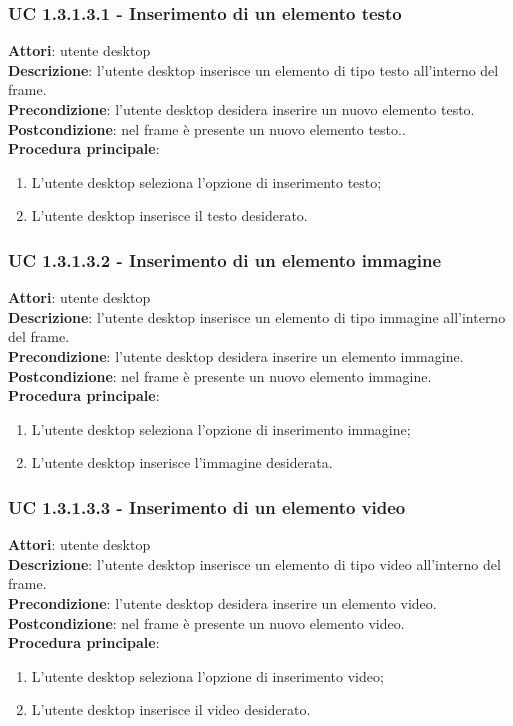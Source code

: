 \subsubsection{UC 1.3.1.3.1 - Inserimento di un elemento testo}{
	\label{uc1.3.1.3.1}
	\textbf{Attori}: utente desktop \\
	\textbf{Descrizione}: l'utente desktop inserisce un elemento di tipo testo all'interno del frame. \\
	\textbf{Precondizione}: l'utente desktop desidera inserire un nuovo elemento testo.	\\
	\textbf{Postcondizione}: nel frame è presente un nuovo elemento testo..	\\
	\textbf{Procedura principale}:
	\begin{enumerate}
		\item L'utente desktop seleziona l'opzione di inserimento testo;
		\item L'utente desktop inserisce il testo desiderato.
	\end{enumerate}
	}
\subsubsection{UC 1.3.1.3.2 - Inserimento di un elemento immagine}{
	\label{uc1.3.1.3.2}
	\textbf{Attori}: utente desktop \\
	\textbf{Descrizione}: l'utente desktop inserisce un elemento di tipo immagine all'interno del frame. \\
	\textbf{Precondizione}: l'utente desktop desidera inserire un elemento immagine.	\\
	\textbf{Postcondizione}: nel frame è presente un nuovo elemento immagine.	\\
	\textbf{Procedura principale}:
	\begin{enumerate}
		\item L'utente desktop seleziona l'opzione di inserimento immagine;
		\item L'utente desktop inserisce l'immagine desiderata.
	\end{enumerate}
	}
\subsubsection{UC 1.3.1.3.3 - Inserimento di un elemento video}{
	\label{uc1.3.1.3.3}
	\textbf{Attori}: utente desktop \\
	\textbf{Descrizione}: l'utente desktop inserisce un elemento di tipo video all'interno del frame. \\
	\textbf{Precondizione}: l'utente desktop desidera inserire un elemento video.	\\
	\textbf{Postcondizione}: nel frame è presente un nuovo elemento video.	\\
	\textbf{Procedura principale}:
	\begin{enumerate}
		\item L'utente desktop seleziona l'opzione di inserimento video;
		\item L'utente desktop inserisce il video desiderato.
	\end{enumerate}
	}
